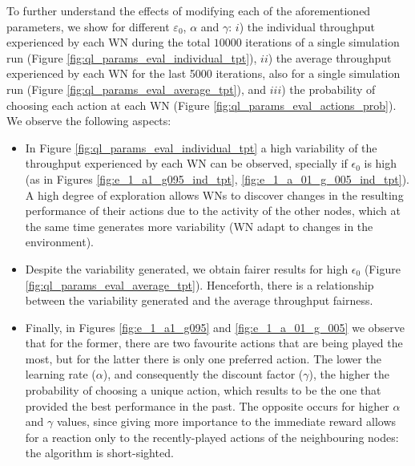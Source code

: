\documentclass[conference]{IEEEtran}
\begin{document}
	To further understand the effects of modifying each of the aforementioned parameters, we show for different $\varepsilon_0$, $\alpha$ and $\gamma$: $i$) the individual throughput experienced by each WN during the total $10000$ iterations of a single simulation run (Figure \ref{fig:ql_params_eval_individual_tpt}), $ii$) the average throughput experienced by each WN for the last 5000 iterations, also for a single simulation run (Figure \ref{fig:ql_params_eval_average_tpt}), and $iii$) the probability of choosing each action at each WN (Figure \ref{fig:ql_params_eval_actions_prob}). We observe the following aspects:
	\begin{itemize}
		\item In Figure \ref{fig:ql_params_eval_individual_tpt} a high variability of the throughput experienced by each WN can be observed, specially if $\epsilon_0$ is high (as in Figures \ref{fig:e_1_a1_g095_ind_tpt}, \ref{fig:e_1_a_01_g_005_ind_tpt}). A high degree of exploration allows WNs to discover changes in the resulting performance of their actions due to the activity of the other nodes, which at the same time generates more variability (WN adapt to changes in the environment).
		\item Despite the variability generated, we obtain fairer results for high $\epsilon_0$ (Figure \ref{fig:ql_params_eval_average_tpt}). Henceforth, there is a relationship between the variability generated and the average throughput fairness.
		\item Finally, in Figures \ref{fig:e_1_a1_g095} and \ref{fig:e_1_a_01_g_005} we observe that for the former, there are two favourite actions that are being played the most, but for the latter there is only one preferred action. The lower the learning rate ($\alpha$), and consequently the discount factor ($\gamma$), the higher the probability of choosing a unique action, which results to be the one that provided the best performance in the past. The opposite occurs for higher $\alpha$ and $\gamma$ values, since giving more importance to the immediate reward allows for a reaction only to the recently-played actions of the neighbouring nodes: the algorithm is short-sighted. 
	\end{itemize}
	
\end{document}
